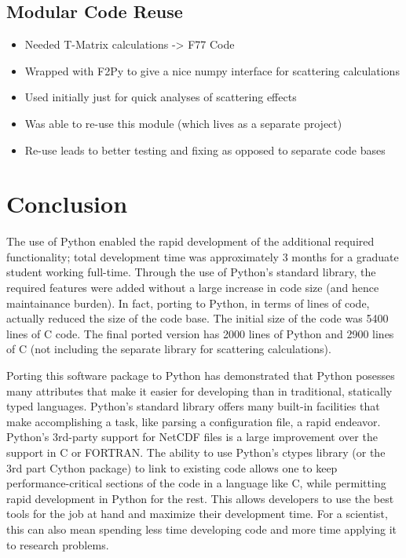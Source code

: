 \documentclass[twocolumn]{article}
\begin{document}
\subsection{Modular Code Reuse}
  \begin{itemize}
    \item Needed T-Matrix calculations -> F77 Code
    \item Wrapped with F2Py to give a nice numpy interface for scattering calculations
    \item Used initially just for quick analyses of scattering effects
    \item Was able to re-use this module (which lives as a separate project)
    \item Re-use leads to better testing and fixing as opposed to separate code bases
  \end{itemize}

\section{Conclusion}
The use of Python enabled the rapid development of the additional required
functionality; total development time was approximately 3 months for a graduate
student working full-time. Through the use of Python's standard library, the required
features were added without a large increase in code size (and hence maintainance
burden).  In fact, porting to Python, in terms of lines of code, actually reduced
the size of the code base. The initial size of the code was 5400 lines of C code.
The final ported version has 2000 lines of Python and 2900 lines of C (not including
the separate library for scattering calculations).

Porting this software package to Python has demonstrated that Python posesses
many attributes that make it easier for developing than in traditional, statically
typed languages. Python's standard library offers many built-in facilities that
make accomplishing a task, like parsing a configuration file, a rapid endeavor.
Python's 3rd-party support for NetCDF files is a large improvement over the
support in C or FORTRAN.  The ability to use Python's ctypes library (or the
3rd part Cython package) to link to existing code allows one to keep
performance-critical sections of the code in a language like C, while permitting
rapid development in Python for the rest. This allows developers to use the best
tools for the job at hand and maximize their development time. For a scientist,
this can also mean spending less time developing code and more time applying
it to research problems.
\end{document}
